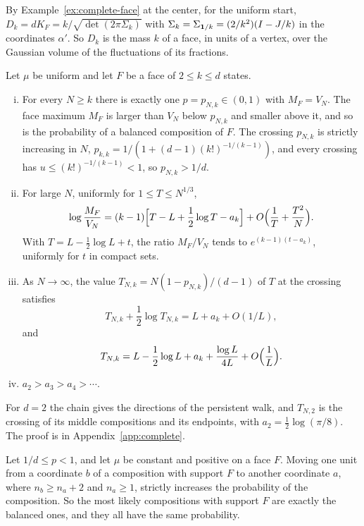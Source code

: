 By Example~\ref{ex:complete-face} at the center, for the uniform start, $D_k=dK_F=k/\sqrt{\det(2\pi\Sigma_k)}$ with
$\Sigma_k=\Sigma_{\mathbf{1}/k}=(2/k^2)(I-J/k)$ in the coordinates $\alpha'$. So $D_k$ is the mass $k$
of a face, in units of a vertex, over the Gaussian volume of the fluctuations of its
fractions.

\begin{theorem}\label{thm:simplex-crossing}
Let $\mu$ be uniform and let $F$ be a face of $2\le k\le d$ states.
\begin{enumerate}[(i)]
\item For every $N\ge k$ there is exactly one $p=p_{N,k}\in(0,1)$ with $M_F=V_N$. The face
maximum $M_F$ is larger than $V_N$ below $p_{N,k}$ and smaller above it, and so is the
probability of a balanced composition of $F$. The crossing $p_{N,k}$ is strictly increasing in $N$,
$p_{k,k}=1/(1+(d-1)(k!)^{-1/(k-1)})$, and every crossing has $u\le(k!)^{-1/(k-1)}<1$, so
$p_{N,k}>1/d$.
\item For large $N$, uniformly for $1\le T\le N^{1/3}$,
\[
\log\frac{M_F}{V_N}=(k-1)\Bigl[T-L+\frac12\log T-a_k\Bigr]
+O\Bigl(\frac1T+\frac{T^2}N\Bigr).
\]
With $T=L-\frac12\log L+t$, the ratio $M_F/V_N$ tends to $e^{(k-1)(t-a_k)}$, uniformly for
$t$ in compact sets.
\item As $N\to\infty$, the value $T_{N,k}=N(1-p_{N,k})/(d-1)$ of $T$ at the crossing satisfies
\[
T_{N,k}+\frac12\log T_{N,k}=L+a_k+O(1/L),
\]
and
\begin{equation}\label{eq:simplex-root-expansion}
T_{N,k}=L-\frac12\log L+a_k+\frac{\log L}{4L}+O\Bigl(\frac1L\Bigr).
\end{equation}
\item $a_2>a_3>a_4>\cdots$.
\end{enumerate}
\end{theorem}

For $d=2$ the chain gives the directions of the persistent walk, and $T_{N,2}$ is the
crossing of its middle compositions and its endpoints, with $a_2=\frac12\log(\pi/8)$. The proof
is in Appendix~\ref{app:complete}.

\begin{theorem}\label{thm:simplex-balance}
Let $1/d\le p<1$, and let $\mu$ be constant and positive on a face $F$. Moving one unit from a
coordinate $b$ of a composition with support $F$ to another coordinate $a$, where $n_b\ge n_a+2$ and
$n_a\ge1$, strictly increases the probability of the composition. So the most likely compositions with support
$F$ are exactly the balanced ones, and they all have the same probability.
\end{theorem}

